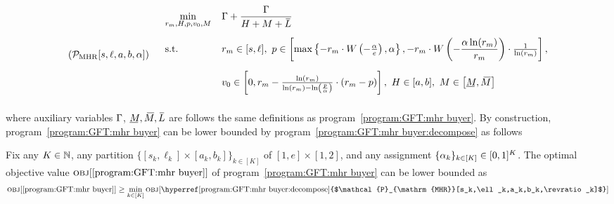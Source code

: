 \begin{align}
\label{program:GFT:mhr buyer:decompose}
\tag{$\mathcal{P}_{\mathrm{MHR}}[s,\ell,a, b,\revratio]$}
\arraycolsep=5.4pt\def\arraystretch{1}
    \begin{array}{llll}
     &\min\limits_{\optreserve, H, \price, \val_0, M}   & 
      \displaystyle\exanteutilratio + \frac{\exanteutilratio}{H + M + \LOverBar} &
      \vspace{10pt}
      \\
      \vspace{10pt}
      &\text{s.t.}
      & \optreserve\in[s, \ell],~
      \price\in \left[\max\left\{
    -\optreserve\cdot \LambertFunc\left(-\frac{\revratio}{e}\right), \revratio\right\},
    - \optreserve\cdot \LambertFunc\left(-\displaystyle\frac{\revratio\ln(\optreserve)}{\optreserve}\right)\cdot \frac{1}{\ln(\optreserve)} \right],~ 
      & 
      \\
      \vspace{10pt}
      && 
      \val_0\in \left[0, \optreserve - \frac{\ln(\optreserve)}{\ln(\optreserve) - \ln\left(\frac{\price}{\revratio}\right)}\cdot (\optreserve - \price)\right],~ 
      H\in[a, b],~
      M\in\left[\MUnderBar, \MOverBar\right]& 
    \end{array}
\end{align}
where auxiliary variables $\Gamma$, $\MUnderBar, \MOverBar, \LOverBar$ are follows the same definitions as program~\ref{program:GFT:mhr buyer}. 
By construction, program~\ref{program:GFT:mhr buyer} can be lower bounded by program~\ref{program:GFT:mhr buyer:decompose} as follows
\begin{lemma}
    Fix any $K\in\mathbb{N}$, any partition $\{[s_k, \ell_k]\times[a_k,b_k]\}_{k\in[K]}$ of $[1, e]\times[1,2]$, and any assignment $\{\alpha_k\}_{k\in[K]} \in[0, 1]^K$. The optimal objective value $\Obj{\text{\ref{program:GFT:mhr buyer}}}$ of program~\ref{program:GFT:mhr buyer} can be lower bounded as
    \begin{align*}
        \Obj{\text{\ref{program:GFT:mhr buyer}}} 
        \geq 
        \min_{k\in[K]} 
        \Obj{\text{\hyperref[program:GFT:mhr buyer:decompose]{$\mathcal{P}_{\mathrm{MHR}}[s_k,\ell_k,a_k,b_k,\revratio_k]$}}}
    \end{align*}
\end{lemma}
